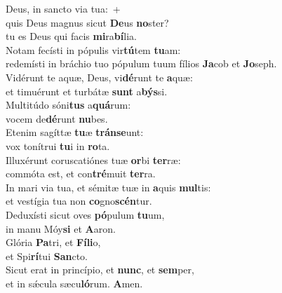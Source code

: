 \oddverse Deus, in sancto via tua:~+\\
\oddverse  quis Deus magnus sicut \textbf{De}us \textbf{no}ster?~\*\\
\oddverse tu es Deus qui facis \textbf{mi}ra\textbf{bí}lia.\\
\evenverse Notam fecísti in pópulis vir\textbf{tú}tem \textbf{tu}am:~\*\\
\evenverse redemísti in bráchio tuo pópulum tuum fílios \textbf{Ja}cob et \textbf{Jo}seph.\\
\oddverse Vidérunt te aquæ, Deus, vi\textbf{dé}runt te \textbf{a}quæ:~\*\\
\oddverse et timuérunt et turbátæ \textbf{sunt} a\textbf{býs}si.\\
\evenverse Multitúdo sóni\textbf{tus} a\textbf{quá}rum:~\*\\
\evenverse vocem de\textbf{dé}runt \textbf{nu}bes.\\
\oddverse Etenim sagíttæ \textbf{tu}æ \textbf{trán}\textbf{se}unt:~\*\\
\oddverse vox tonítrui \textbf{tu}i in \textbf{ro}ta.\\
\evenverse Illuxérunt coruscatiónes tuæ \textbf{or}bi \textbf{ter}ræ:~\*\\
\evenverse commóta est, et con\textbf{tré}muit \textbf{ter}ra.\\
\oddverse In mari via tua, et sémitæ tuæ in \textbf{a}quis \textbf{mul}tis:~\*\\
\oddverse et vestígia tua non \textbf{co}gno\textbf{scén}tur.\\
\evenverse Deduxísti sicut oves \textbf{pó}pulum \textbf{tu}um,~\*\\
\evenverse in manu Móy\textbf{si} et \textbf{A}aron.\\
\oddverse Glória \textbf{Pa}tri, et \textbf{Fí}\textbf{li}o,~\*\\
\oddverse et Spi\textbf{rí}tui \textbf{San}cto.\\
\evenverse Sicut erat in princípio, et \textbf{nunc}, et \textbf{sem}per,~\*\\
\evenverse et in sǽcula sæcu\textbf{ló}rum. \textbf{A}men.\\
